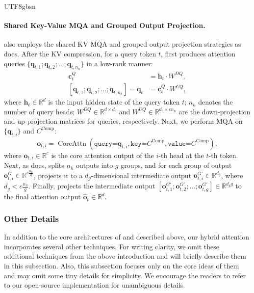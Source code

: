 \begin{CJK*}{UTF8}{gbsn}
\paragraph{Shared Key-Value MQA and Grouped Output Projection.}
\hca{} also employs the shared KV MQA and grouped output projection strategies as \csa{} does. 
After the KV compression, for a query token $t$, \hca{} first produces attention queries $\{\mathbf{q}_{t, 1};\mathbf{q}_{t, 2};...;\mathbf{q}_{t, n_{h}}\}$ in a low-rank manner: 
\begin{align}
    \mathbf{c}_{t}^{Q} &= \mathbf{h}_{t} \cdot W^{DQ}, \\
    [\mathbf{q}_{t, 1};\mathbf{q}_{t, 2};...;\mathbf{q}_{t, n_{h}}] = \mathbf{q}_{t} &= \mathbf{c}_{t}^{Q} \cdot W^{UQ},
\end{align}
where $\mathbf{h}_{t} \in \mathbb{R}^{d}$ is the input hidden state of the query token $t$; $n_{h}$ denotes the number of query heads; $W^{DQ} \in \mathbb{R}^{d \times d_c}$ and $W^{UQ} \in \mathbb{R}^{d_c \times c n_h}$ are the down-projection and up-projection matrices for queries, respectively. 
Next, we perform MQA on $\{\mathbf{q}_{t, i}\}$ and $C^{\text{Comp}}$: 
\begin{equation}
    \mathbf{o}_{t,i} = \operatorname{CoreAttn}\left( \texttt{query=}\mathbf{q}_{t,i}, \texttt{key=}C^{\text{Comp}}, \texttt{value=}C^{\text{Comp}} \right),
\end{equation}
where $\mathbf{o}_{t,i} \in \mathbb{R}^{c}$ is the core attention output of the $i$-th head at the $t$-th token. 
Next, as \csa{} does, \hca{} splits $n_h$ outputs into $g$ groups, and for each group of output $\mathbf{o}^G_{t, i} \in \mathbb{R}^{c \frac{n_h}{g}}$, \hca{} projects it to a $d_g$-dimensional intermediate output $\mathbf{o}^{G'}_{t, i} \in \mathbb{R}^{d_g}$, where $d_g < c \frac{n_h}{g}$. 
Finally, \hca{} projects the intermediate output $[\mathbf{o}^{G'}_{t, 1}; \mathbf{o}^{G'}_{t, 2}; ...; \mathbf{o}^{G'}_{t, g}] \in \mathbb{R}^{d_gg}$ to the final attention output $\mathbf{\hat{o}}_{t} \in \mathbb{R}^{d}$. 

\subsubsection{Other Details}

In addition to the core architectures of \csa{} and \hca{} described above, our hybrid attention incorporates several other techniques. 
For writing clarity, we omit these additional techniques from the above introduction and will briefly describe them in this subsection.
Also, this subsection focuses only on the core ideas of them and may omit some tiny details for simplicity. 
We encourage the readers to refer to our open-source implementation for unambiguous details.


\end{CJK*}
